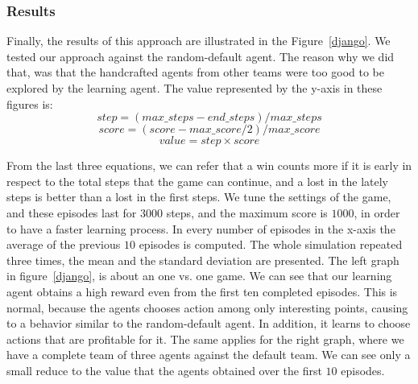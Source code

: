 \documentclass[conference]{IEEEtran}
\begin{document}
\subsubsection{Results}
Finally, the results of this approach are illustrated in the Figure~\ref{django}. We tested our approach against the random-default agent. The reason why we did that, was that the handcrafted agents from other teams were too good to be explored by the learning agent. The value represented by the y-axis in these figures is:
\begin{equation}
step = (max\_steps - end\_steps)/ max\_steps
\end{equation}
\begin{equation}
score = (score - max\_score/2)/max\_score
\end{equation}
\begin{equation}
value = step \times score
\end{equation}

From the last three equations, we can refer that a win counts more if it is early in respect to the total steps that the game can continue, and a lost in the lately steps is better than a lost in the first steps. We tune the settings of the game, and these episodes last for $3000$ steps, and the maximum score is $1000$, in order to have a faster learning process. In every number of episodes in the x-axis the average of the previous $10$ episodes is computed. The whole simulation repeated three times, the mean and the standard deviation are presented. The left graph in figure~\ref{django}, is about an one vs. one game. We can see that our learning agent obtains a high reward even from the first ten completed episodes. This is normal, because the agents chooses action among only interesting points, causing to a behavior similar to the random-default agent. In addition, it learns to choose actions that are profitable for it. The same applies for the right graph, where we have a complete team of three agents against the default team. We can see only a small reduce to the value that the agents obtained over the first $10$ episodes.
\end{document}
